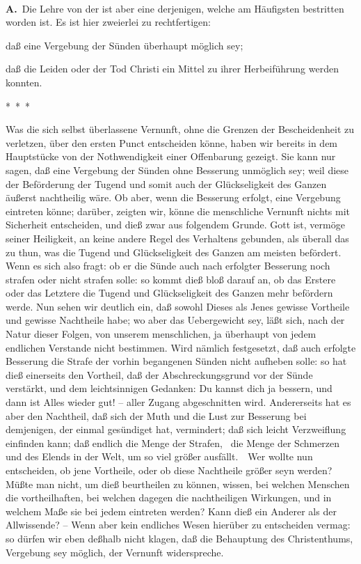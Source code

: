\begin{aufza}
\item \mbox{}\\
\textbf{A.}~Die Lehre von der  ist aber eine derjenigen, welche am Häufigsten bestritten worden ist. Es ist hier zweierlei zu rechtfertigen:~
\begin{aufzb}
\item daß eine Vergebung der Sünden überhaupt möglich sey;
\item daß die Leiden oder der Tod Christi ein Mittel zu ihrer Herbeiführung werden konnten.
\end{aufzb}
\begin{center}*\ *\ *\end{center}
\begin{aufzb}
\item Was die sich selbst überlassene Vernunft, ohne die Grenzen der Bescheidenheit zu verletzen, über den ersten Punct entscheiden könne, haben wir bereits in dem Hauptstücke von der Nothwendigkeit einer Offenbarung gezeigt. Sie kann nur sagen, daß eine Vergebung der Sünden ohne Besserung unmöglich sey; weil diese der Beförderung der Tugend und somit auch der Glückseligkeit des Ganzen äußerst nachtheilig wäre. Ob aber, wenn die Besserung erfolgt, eine Vergebung eintreten könne; darüber, zeigten wir, könne die menschliche Vernunft nichts mit Sicherheit entscheiden, und dieß zwar aus folgendem Grunde. Gott ist, vermöge seiner Heiligkeit, an keine andere Regel des Verhaltens gebunden, als überall das zu thun, was die Tugend und Glückseligkeit des Ganzen am meisten befördert. Wenn es sich also fragt: ob er die Sünde auch nach erfolgter Besserung noch strafen oder nicht strafen solle: so kommt dieß bloß darauf an, ob das Erstere oder das Letztere die Tugend und Glückseligkeit des Ganzen mehr befördern werde. Nun sehen wir deutlich ein, daß sowohl Dieses als Jenes gewisse Vortheile und gewisse Nachtheile habe; wo aber das Uebergewicht sey, läßt sich, nach der Natur dieser Folgen, von unserem menschlichen, ja überhaupt von jedem endlichen Verstande nicht bestimmen. Wird nämlich festgesetzt, daß auch erfolgte Besserung die Strafe der vorhin begangenen Sünden nicht aufheben solle: so hat dieß einerseits den Vortheil, daß der Abschreckungsgrund vor der Sünde verstärkt, und dem leichtsinnigen Gedanken: Du kannst dich ja bessern, und dann ist Alles wieder gut! -- aller Zugang abgeschnitten wird. Andererseits hat es aber den Nachtheil, daß sich der Muth und die Lust zur Besserung bei demjenigen, der einmal gesündiget hat, vermindert; daß sich leicht Verzweiflung einfinden kann; daß endlich die Menge der Strafen, \dh\ die Menge der Schmerzen und des Elends in der Welt, um so viel größer ausfällt.~\ Wer wollte nun entscheiden, ob jene Vortheile, oder ob diese Nachtheile größer seyn werden? Müßte man nicht, um dieß beurtheilen zu können, wissen, bei welchen Menschen die vortheilhaften, bei welchen dagegen die nachtheiligen Wirkungen, und in welchem Maße sie bei jedem eintreten werden? Kann dieß ein Anderer als der Allwissende? -- Wenn aber kein endliches Wesen hierüber zu entscheiden vermag: so dürfen wir eben deßhalb nicht klagen, daß die Behauptung des Christenthums, Vergebung sey möglich, der Vernunft widerspreche.

\end{aufzb}
\end{aufza}
